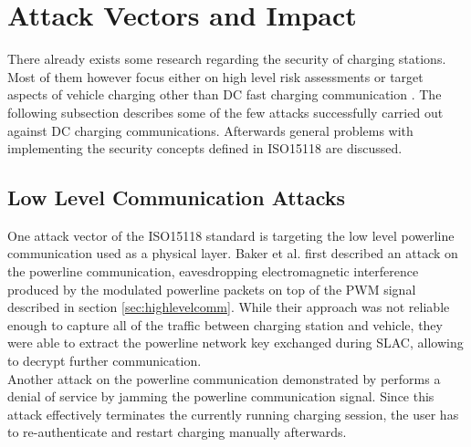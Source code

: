 \documentclass[conference,flushend]{iaria} %
\begin{document}
\section{Attack Vectors and Impact}
There already exists some research regarding the security of charging stations. Most of them however focus either on high level risk assessments \cite{acharya_cybersecurity_2020, sanghvi_cybersecurity_2021, assi_ensuring_2023, mahrukh_load_2023, park_potential_2019, ahalawat_security_2022, bao_threat_2018} or target aspects of vehicle charging other than DC fast charging communication \cite{nasr_chargeprint_2023, sklyar_chargepoint_nodate, sarieddine_investigating_2023, nasr_large-scale_nodate, nasr_power_2022}.
The following subsection describes some of the few attacks successfully carried out against DC charging communications.
Afterwards general problems with implementing the security concepts defined in ISO15118 are discussed.

\subsection{Low Level Communication Attacks}
One attack vector of the ISO15118 standard is targeting the low level powerline communication used as a physical layer.
Baker et al. \cite{baker_losing_2019} first described an attack on the powerline communication, eavesdropping electromagnetic interference produced by the modulated powerline packets on top of the PWM signal described in section \ref{sec:highlevelcomm}.
While their approach was not reliable enough to capture all of the traffic between charging station and vehicle, they were able to extract the powerline network key exchanged during SLAC, allowing to decrypt further communication. \\
Another attack on the powerline communication demonstrated by \cite{kohler_brokenwire_2023} performs a denial of service by jamming the powerline communication signal.
Since this attack effectively terminates the currently running charging session, the user has to re-authenticate and restart charging manually afterwards.
\end{document}
